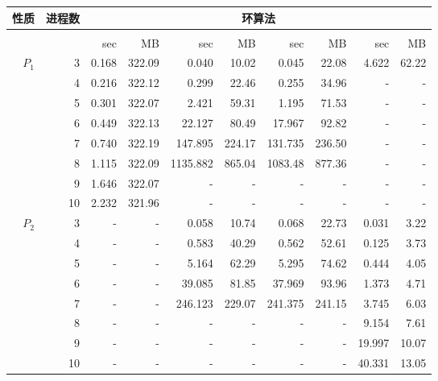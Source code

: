\begin{figure}[h!]\scriptsize
	\centering
	\setlength{\tabcolsep}{8pt}
	\renewcommand\arraystretch{0.8}
	\begin{tabular}{| r | r | r | r | r | r | r | r | r | r |}
		\hline
		\textbf{性质} & \textbf{进程数} & \multicolumn{8}{c|}{环算法} \\
		\hline
		{} & {} & \multicolumn{2}{c|}{\verds{}} & \multicolumn{2}{c|}{\nusmv{}} & \multicolumn{2}{c|}{\nuxmv{}} &  \multicolumn{2}{c|}{\sctl{}} \\
		\hline
		{} & {} & sec & MB & sec & MB & sec & MB & sec & MB \\
		\hline
		\multirow{6}{*}{$P_1$} & 3 & 0.168 & 322.09 & 0.040 & 10.02 & 0.045 & 22.08 & 4.622 & 62.22  \\
		{} & 4 & 0.216 & 322.12 & 0.299 & 22.46 & 0.255 & 34.96 & - & -  \\
		{} & 5 & 0.301 & 322.07 & 2.421 & 59.31 & 1.195 & 71.53 & - & -  \\
		{} & 6 & 0.449 & 322.13 & 22.127 & 80.49 & 17.967 & 92.82 & - & -  \\
		{} & 7 & 0.740 & 322.19 & 147.895 & 224.17 & 131.735 & 236.50 & - & -  \\
		{} & 8 & 1.115 & 322.09 & 1135.882 & 865.04 & 1083.48 & 877.36 & - & -  \\
		{} & 9 & 1.646 & 322.07 & - & - & - & - & - & -  \\
		{} & 10 & 2.232 & 321.96 & - & - & - & - & - & -  \\
		\hline
		\multirow{6}{*}{$P_2$} & 3 & - & - & 0.058 & 10.74 & 0.068 & 22.73 & 0.031 & 3.22  \\
		{} & 4 & - & - & 0.583 & 40.29 & 0.562 & 52.61 & 0.125 & 3.73  \\
		{} & 5 & - & - & 5.164 & 62.29 & 5.295 & 74.62 & 0.444 & 4.05  \\
		{} & 6 & - & - & 39.085 & 81.85 & 37.969 & 93.96 & 1.373 & 4.71  \\
		{} & 7 & - & - & 246.123 & 229.07 & 241.375 & 241.15 & 3.745 & 6.03  \\
		{} & 8 & - & - & - & - & - & - & 9.154 & 7.61  \\
		{} & 9 & - & - & - & - & - & - & 19.997 & 10.07  \\
		{} & 10 & - & - & - & - & - & - & 40.331 & 13.05  \\
		\hline

\end{tabular}
\end{figure}
